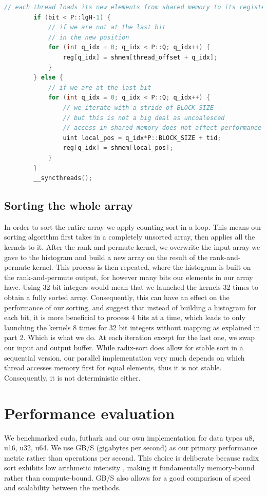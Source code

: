 \documentclass{article}
\begin{document}
\begin{lstlisting}[language=c++]
        // each thread loads its new elements from shared memory to its registers
        if (bit < P::lgH-1) {
            // if we are not at the last bit
            // in the new position
            for (int q_idx = 0; q_idx < P::Q; q_idx++) {
                reg[q_idx] = shmem[thread_offset + q_idx];
            }
        } else {
            // if we are at the last bit
            for (int q_idx = 0; q_idx < P::Q; q_idx++) {
                // we iterate with a stride of BLOCK_SIZE
                // but this is not a big deal as uncoalesced 
                // access in shared memory does not affect performance
                uint local_pos = q_idx*P::BLOCK_SIZE + tid;
                reg[q_idx] = shmem[local_pos];
            }
        }
        __syncthreads();
\end{lstlisting}


\subsection{Sorting the whole array}


In order to sort the entire array we apply counting sort in a loop. 
This means our sorting algorithm first takes in a completely unsorted array, then applies all the kernels to it. 
After the rank-and-permute kernel, we overwrite the input array we gave to the histogram and build a new array on the result of the rank-and-permute kernel. 
This process is then repeated, where the histogram is built on the rank-and-permute output, for however many bits our elements in our array have. 
Using 32 bit integers would mean that we launched the kernels 32 times to obtain a fully sorted array. 
Consequently, this can have an effect on the performance of our sorting, \cite{satish}  and \cite{ha2010implicit} suggest that instead of building a histogram for each bit, it is more beneficial to process 4 bits at a time, which leads to only launching the kernels 8 times for 32 bit integers without mapping as explained in part 2. Which is what we do. 
At each iteration except for the last one, we swap our input and output buffer.
While radix-sort does allow for stable sort in a sequential version, our parallel implementation very much depends on which thread accesses memory first for equal elements, thus it is not stable. Consequently, it is not deterministic either. 

\section{Performance evaluation}
We benchmarked cuda, futhark and our own implementation for data types u8, u16, u32, u64.
We use GB/S (gigabytes per second) as our primary performance metric rather than operations per second. This choice is deliberate because radix sort exhibits low arithmetic intensity \citep{ha2010implicit}, making it fundamentally memory-bound rather than compute-bound. GB/S also allows for a good comparison of speed and scalability between the methods.
\end{document}
